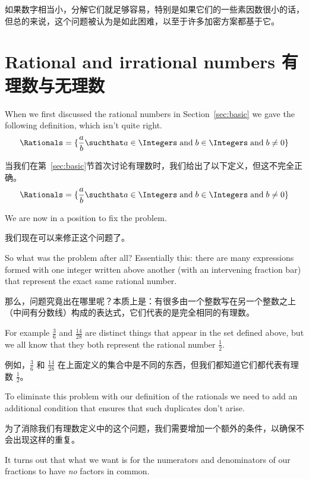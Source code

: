如果数字相当小，分解它们就足够容易，特别是如果它们的一些素因数很小的话，但总的来说，这个问题被认为是如此困难，以至于许多加密方案都基于它。

\newpage
  



\newpage

\section{Rational and irrational numbers 有理数与无理数}
\label{sec:rat}

When we first discussed the rational numbers in Section~\ref{sec:basic}
we gave the following definition, which isn't quite right.
\[ \Rationals = \{ \frac{a}{b} \suchthat a \in \Integers \; \mbox{and} \;
b \in \Integers \; \mbox{and} \; b \neq 0 \} \]

当我们在第~\ref{sec:basic}节首次讨论有理数时，我们给出了以下定义，但这不完全正确。
\[ \Rationals = \{ \frac{a}{b} \suchthat a \in \Integers \; \mbox{and} \;
b \in \Integers \; \mbox{and} \; b \neq 0 \} \]

We are now in a position to fix the problem.

我们现在可以来修正这个问题了。

So what was the problem after all?  Essentially this: there are
many expressions formed with one integer written above another (with an
intervening fraction bar) that represent the exact same rational
number.

那么，问题究竟出在哪里呢？本质上是：有很多由一个整数写在另一个整数之上（中间有分数线）构成的表达式，它们代表的是完全相同的有理数。

For example $\frac{3}{6}$ and $\frac{14}{28}$ are distinct
things that appear in the set defined above, but we all know that they
both represent the rational number $\frac{1}{2}$.

例如，$\frac{3}{6}$ 和 $\frac{14}{28}$ 在上面定义的集合中是不同的东西，但我们都知道它们都代表有理数 $\frac{1}{2}$。

To eliminate this
problem with our definition of the rationals we need to add an
additional condition that ensures that such duplicates don't arise.

为了消除我们有理数定义中的这个问题，我们需要增加一个额外的条件，以确保不会出现这样的重复。

It turns out that what we want is for the numerators and denominators
of our fractions to have {\em no} factors in common.

